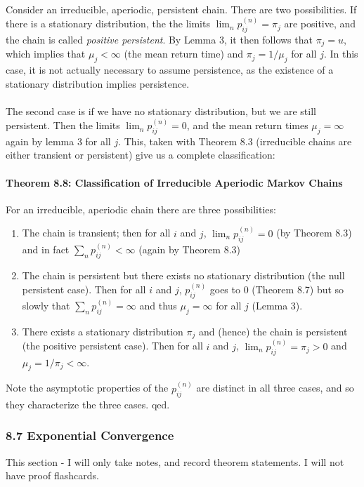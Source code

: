 \documentclass[12pt,a4paper]{article}
\newcommand{\1}[1]{\mathbbm{1}\left\{ #1 \right\}}
\begin{document}
\\\\
Consider an irreducible, aperiodic, persistent chain. There are two possibilities. If there is a stationary distribution, the the limits $\lim_n p_{ij}^{(n)} = \pi_j$ are positive, and the chain is called \textit{positive persistent}. By Lemma 3, it then follows that $\pi_j = u$, which implies that $\mu_j < \infty$ (the mean return time) and $\pi_j = 1/\mu_j$ for all $j$. In this case, it is not actually necessary to assume persistence, as the existence of a stationary distribution implies persistence.
\\\\
The second case is if we have no stationary distribution, but we are still persistent. Then the limits $\lim_n p_{ij}^{(n)} = 0$, and the mean return times $\mu_j = \infty$ again by lemma 3 for all $j$. This, taken with Theorem 8.3 (irreducible chains are either transient or persistent) give us a complete classification:

\paragraph{Theorem 8.8: Classification of Irreducible Aperiodic Markov Chains} For an irreducible, aperiodic chain there are three possibilities:
\begin{enumerate}
	\item The chain is transient; then for all $i$ and $j$, $\lim_n p_{ij}^{(n)} = 0$ (by Theorem 8.3) and in fact $\sum_n p_{ij}^{(n)} < \infty$ (again by Theorem 8.3)
	
	\item The chain is persistent but there exists no stationary distribution (the null persistent case). Then for all $i$ and $j$, $p_{ij}^{(n)}$ goes to $0$ (Theorem 8.7) but so slowly that $\sum_n p_{ij}^{(n)} = \infty$ and thus $\mu_j = \infty$ for all $j$ (Lemma 3).
	
	\item There exists a stationary distribution $\pi_j$ and (hence) the chain is persistent (the positive persistent case). Then for all $i$ and $j$, $\lim_n p_{ij}^{(n)} = \pi_j > 0$ and $\mu_j = 1/\pi_j < \infty$.
\end{enumerate}
Note the asymptotic properties of the $p_{ij}^{(n)}$ are distinct in all three cases, and so they characterize the three cases. qed.

\subsubsection{8.7 Exponential Convergence}
This section - I will only take notes, and record theorem statements. I will not have proof flashcards.
\end{document}
